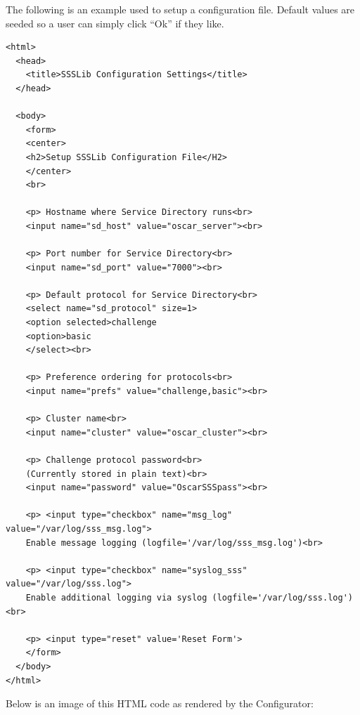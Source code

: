 The following is an example  used to setup a
configuration file.  Default values are seeded so a user can simply click
``Ok'' if they like.

\begin{scriptsize}
\begin{verbatim}
<html>
  <head> 
    <title>SSSLib Configuration Settings</title> 
  </head> 

  <body>
    <form>
    <center>
    <h2>Setup SSSLib Configuration File</H2>
    </center>
    <br>

    <p> Hostname where Service Directory runs<br>
    <input name="sd_host" value="oscar_server"><br>

    <p> Port number for Service Directory<br>
    <input name="sd_port" value="7000"><br>

    <p> Default protocol for Service Directory<br>
    <select name="sd_protocol" size=1>
    <option selected>challenge
    <option>basic
    </select><br>

    <p> Preference ordering for protocols<br>
    <input name="prefs" value="challenge,basic"><br>

    <p> Cluster name<br>
    <input name="cluster" value="oscar_cluster"><br>

    <p> Challenge protocol password<br>
    (Currently stored in plain text)<br>
    <input name="password" value="OscarSSSpass"><br>   

    <p> <input type="checkbox" name="msg_log" value="/var/log/sss_msg.log">
    Enable message logging (logfile='/var/log/sss_msg.log')<br>

    <p> <input type="checkbox" name="syslog_sss" value="/var/log/sss.log">   
    Enable additional logging via syslog (logfile='/var/log/sss.log')<br>

    <p> <input type="reset" value='Reset Form'>
    </form>
  </body> 
</html>
\end{verbatim}
\end{scriptsize}

Below is an image of this HTML code as rendered by the Configurator:

